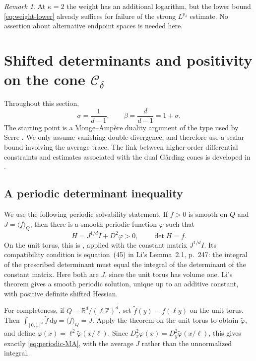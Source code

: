 \documentclass[11pt,a4paper,reqno]{amsart}
\theoremstyle{plain}
\theoremstyle{remark}
\newtheorem{remark}[theorem]{Remark}
\numberwithin{equation}{section}
\newcommand{\R}{\mathbb R}
\newcommand{\Cdelta}{\mathcal C_\delta}
\newcommand{\pcrit}{p_\delta}
\newcommand{\dd}{\,\mathrm d}
\newcommand{\avg}[1]{\langle#1\rangle_Q}
\begin{document}
\begin{remark}
At $\kappa=2$ the weight has an additional logarithm, but the lower bound \eqref{eq:weight-lower} already suffices for failure of the strong $L^{\pcrit}$ estimate. No assertion about alternative endpoint spaces is needed here.
\end{remark}

\section{Shifted determinants and positivity on the cone \texorpdfstring{$\Cdelta$}{C-delta}}\label{sec:determinants}
Throughout this section,
\[
 \sigma=\frac1{d-1},\qquad \beta=\frac d{d-1}=1+\sigma.
\]
The starting point is a Monge--Amp\`ere duality argument of the type used by Serre \cite[Theorem~2.1 and its proof]{Serre2018}. We only assume vanishing double divergence, and therefore use a scalar bound involving the average trace. The link between higher-order differential constraints and estimates associated with the dual G{\aa}rding cones is developed in \cite[Theorem~D]{GRS2024}.

\subsection{A periodic determinant inequality}
We use the following periodic solvability statement. If $f>0$ is smooth on $Q$ and $J=\avg f$, then there is a smooth periodic function $\varphi$ such that
\begin{equation}\label{eq:periodic-MA}
 H=J^{1/d}I+D^2\varphi>0,\qquad \det H=f.
\end{equation}
On the unit torus, this is \cite[Theorem~2.2, p.~248]{Li1990}, applied with the constant matrix $J^{1/d}I$. Its compatibility condition is equation~(45) in Li's Lemma~2.1, p.~247: the integral of the prescribed determinant must equal the integral of the determinant of the constant matrix. Here both are $J$, since the unit torus has volume one. Li's theorem gives a smooth periodic solution, unique up to an additive constant, with positive definite shifted Hessian.

For completeness, if $Q=\R^d/(\ell\mathbb Z)^d$, set $\widetilde f(y)=f(\ell y)$ on the unit torus. Then $\int_{[0,1]^d}\widetilde f\dd y=\avg f=J$. Apply the theorem on the unit torus to obtain $\widetilde\varphi$, and define $\varphi(x)=\ell^2\widetilde\varphi(x/\ell)$. Since $D_x^2\varphi(x)=D_y^2\widetilde\varphi(x/\ell)$, this gives exactly \eqref{eq:periodic-MA}, with the average $J$ rather than the unnormalized integral.
\end{document}

